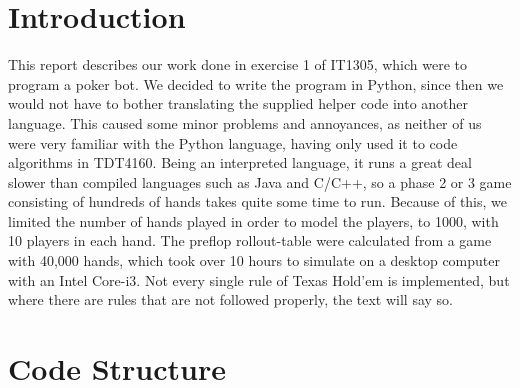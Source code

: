 \documentclass[titlepage]{article}
\begin{document}
\begin{itemize}
\section{Introduction}
	This report describes our work done in exercise 1 of IT1305, which were to program a poker bot. We decided to write the program in Python, since then we would not have to bother translating the supplied helper code into another language. This caused some minor problems and annoyances, as neither of us were very familiar with the Python language, having only used it to code algorithms in TDT4160. Being an interpreted language, it runs a great deal slower than compiled languages such as Java and C/C++, so a phase 2 or 3 game consisting of hundreds of hands takes quite some time to run. Because of this, we limited the number of hands played in order to model the players, to 1000, with 10 players in each hand. The preflop rollout-table were calculated from a game with 40,000 hands, which took over 10 hours to simulate on a desktop computer with an Intel Core-i3. Not every single rule of Texas Hold'em is implemented, but where there are rules that are not followed properly, the text will say so. 
	
\section{Code Structure}

\end{itemize}
\end{document}
